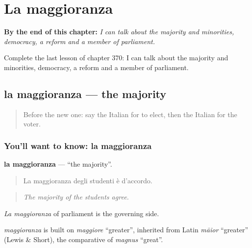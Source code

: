 
\chapter{La maggioranza}
\label{ch:it-la-maggioranza}

\begin{chapteropening}
\textbf{By the end of this chapter:} \emph{I can talk about the majority and minorities, democracy, a reform and a member of parliament.}

Complete the last lesson of chapter 370: I can talk about the majority and minorities, democracy, a reform and a member of parliament.
\end{chapteropening}

\section[la maggioranza]{la maggioranza — the majority}

\label{lesson:IT-C370-maggioranza}



\begin{quote}
Before the new one: say the Italian for to elect, then the Italian for the voter.
\end{quote}

\subsection*{You'll want to know: la maggioranza}
\textbf{la maggioranza} — \textquotedblleft{}the majority\textquotedblright{}.

\begin{quote}
La maggioranza degli studenti è d'accordo.
\end{quote}

\begin{quote}
\emph{The majority of the students agree.}
\end{quote}

\emph{La maggioranza} of parliament is the governing side.

\begin{cousinweb}
\emph{maggioranza} is built on \emph{maggiore} \textquotedblleft{}greater\textquotedblright{}, inherited from Latin \emph{māior} \textquotedblleft{}greater\textquotedblright{} (Lewis \& Short), the comparative of \emph{magnus} \textquotedblleft{}great\textquotedblright{}.
\end{cousinweb}

